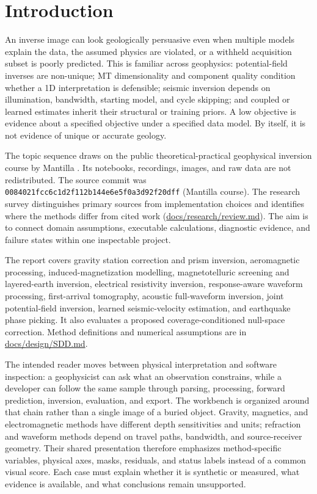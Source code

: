 \section{Introduction}\label{introduction}

An inverse image can look geologically persuasive even when multiple
models explain the data, the assumed physics are violated, or a withheld
acquisition subset is poorly predicted. This is familiar across
geophysics: potential-field inverses are non-unique; MT dimensionality
and component quality condition whether a 1D interpretation is
defensible; seismic inversion depends on illumination, bandwidth,
starting model, and cycle skipping; and coupled or learned estimates
inherit their structural or training priors. A low objective is evidence
about a specified objective under a specified data model. By itself, it
is not evidence of unique or accurate geology.

The topic sequence draws on the public theoretical-practical geophysical
inversion course by Mantilla \cite{course}. Its notebooks, recordings, images, and raw
data are not redistributed. The source commit was
\texttt{0084021fcc6c1d2f112b144e6e5f0a3d92f20dff} (Mantilla course). The
research survey distinguishes primary sources from implementation
choices and identifies where the methods differ from cited work
(\url{docs/research/review.md}). The aim is to connect domain
assumptions, executable calculations, diagnostic evidence, and failure
states within one inspectable project.

The report covers gravity station correction and prism inversion,
aeromagnetic processing, induced-magnetization modelling,
magnetotelluric screening and layered-earth inversion, electrical
resistivity inversion, response-aware waveform processing, first-arrival
tomography, acoustic full-waveform inversion, joint potential-field
inversion, learned seismic-velocity estimation, and earthquake phase
picking. It also evaluates a proposed coverage-conditioned null-space
correction. Method definitions and numerical assumptions are in
\url{docs/design/SDD.md}.

The intended reader moves between physical interpretation and software
inspection: a geophysicist can ask what an observation constrains, while
a developer can follow the same sample through parsing, processing,
forward prediction, inversion, evaluation, and export. The workbench is
organized around that chain rather than a single image of a buried
object. Gravity, magnetics, and electromagnetic methods have different
depth sensitivities and units; refraction and waveform methods depend
on travel paths, bandwidth, and source-receiver geometry. Their shared
presentation therefore emphasizes method-specific variables, physical
axes, masks, residuals, and status labels instead of a common visual
score. Each case must explain whether it is synthetic or measured,
what evidence is available, and what conclusions remain unsupported.

